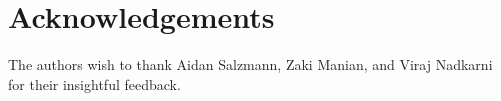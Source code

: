 \section{Acknowledgements}

The authors wish to thank
Aidan Salzmann, Zaki Manian, and Viraj Nadkarni
for their insightful feedback.
